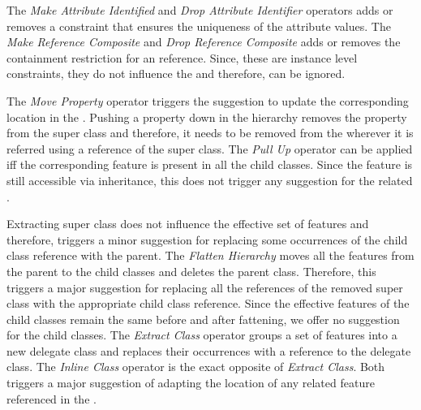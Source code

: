 The \textit{Make Attribute Identified} and \textit{Drop Attribute Identifier} operators adds or removes a constraint that ensures the uniqueness of the attribute values. The \textit{Make Reference Composite} and \textit{Drop Reference Composite} adds or removes the containment restriction for an reference. Since, these are instance level constraints, they do not influence the \viewtype and therefore, can be ignored.

 

The \textit{Move Property} operator triggers the suggestion to update the corresponding location in the \viewtype. Pushing a property down in the hierarchy removes the property from the super class and therefore, it needs to be removed from the \viewtype wherever it is referred using a reference of the super class. The \textit{Pull Up} operator can be applied iff the corresponding feature is present in all the child classes. Since the feature is still accessible via inheritance, this does not trigger any suggestion for the related \viewtypes.

Extracting super class does not influence the effective set of features and therefore, triggers a minor suggestion for replacing some occurrences of the child class reference with the parent. The \textit{Flatten Hierarchy} moves all the features from the parent to the child classes and deletes the parent class. Therefore, this triggers a major suggestion for replacing all the references of the removed super class with the appropriate child class reference. Since the effective features of the child classes remain the same before and after fattening, we offer no suggestion for the child classes. The \textit{Extract Class} operator groups a set of features into a new delegate class and replaces their occurrences with a reference to the delegate class. The \textit{Inline Class} operator is the exact opposite of \textit{Extract Class}. Both triggers a major suggestion of adapting the location of any related feature referenced in the \viewtype.

